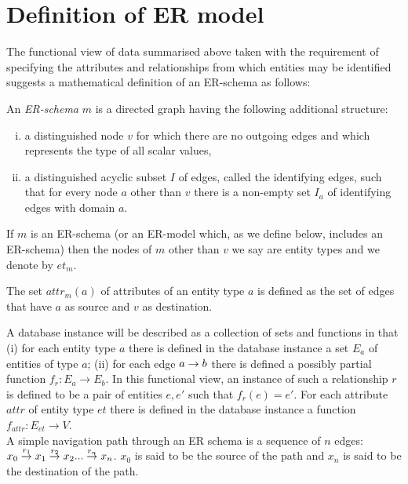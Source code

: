 \documentclass[10pt,a4paper]{article}
\newcommand{\commentary}[1]{\marginpar{\footnotesize #1}}
\newcommand{\genericmodel}{\mathcal{M}}
\renewcommand{\genericmodel}{{m}}
\newcommand{\veee}{v}
\newcommand{\Veee}{V}
\newcommand{\et}[1][\genericmodel]{et_{#1}}
\newcommand{\attr}[2] [\genericmodel]{attr_{#1}(#2)}
\newcommand{\term}[1]{\textit{{#1}}}
\begin{document}
\newpage
\section{Definition of ER model}
The functional view of data summarised above\commentary{No it isn't.} taken with the requirement of specifying the attributes and relationships from which entities may be identified suggests a mathematical definition of an ER-schema  as  follows:

\begin{definition}
An \term{ER-schema} $\genericmodel$ is a directed graph having the following additional structure:

\begin{enumerate} [(i)]
\item{a distinguished node $\veee$ for which there are no outgoing edges and which represents the type of all scalar values, }

\item{a distinguished acyclic subset $I$ of edges, called the identifying edges, such that
for every node $a$ other than $\veee$ there is a non-empty set $I_a$ of identifying edges with domain $a$. 
}
\end{enumerate}

\end{definition}

If $\genericmodel$ is an ER-schema (or an ER-model which, as we define below, 
includes an ER-schema) then the nodes of $\genericmodel$ other than $\veee$ we say are entity types and we denote by $\et$.

The set $\attr{a}$ of attributes of an entity type $a$ is defined as the set of edges that have $a$ as source and  $\veee$ as destination. 

A database instance will be described as a collection of sets 
and functions in that (i) for each entity type $a$ there is defined in 
the database instance a set $E_a$ of entities of type $a$;
(ii) for each edge $a \rightarrow b$
there is defined a possibly partial function $f_r : E_a \rightarrow E_b$. 
In this functional view, an instance of such a relationship $r$ is defined to be a pair 
of entities $e,e'$ such that $f_r(e)=e'$. For each attribute $attr$
of entity type $et$ there is defined in the database instance a function
$f_{attr}: E_{et} \rightarrow \Veee$. \\

\noindent A simple navigation path through an ER schema  is a
sequence of  $n$ edges:
$\overset{r_1}{x_0 \rightarrow   x_1} \overset{r_2}{\rightarrow} x_2 ... \overset{r_n}{\rightarrow} x_n$.  $x_0$ is said to be the source of the path and $x_n$ is said to be the destination of the path. 
\end{document}
